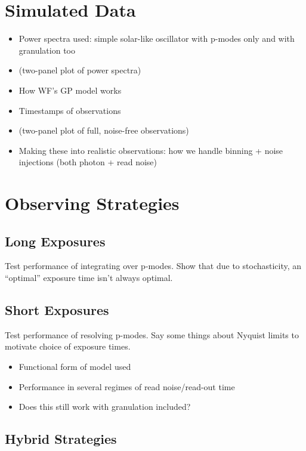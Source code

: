 \documentclass[modern]{aastex62}
\begin{document}
\section{Simulated Data}

\begin{itemize}
\item Power spectra used: simple solar-like oscillator with p-modes only and with granulation too
\item (two-panel plot of power spectra)
\item How WF's GP model works
\item Timestamps of observations
\item (two-panel plot of full, noise-free observations)
\item Making these into realistic observations: how we handle binning + noise injections (both photon + read noise)
\end{itemize}

\section{Observing Strategies}

\subsection{Long Exposures}

Test performance of integrating over p-modes. Show that due to stochasticity, an ``optimal'' exposure time isn't always optimal.

\subsection{Short Exposures}

Test performance of resolving p-modes. Say some things about Nyquist limits to motivate choice of exposure times.

\begin{itemize}
\item Functional form of model used
\item Performance in several regimes of read noise/read-out time
\item Does this still work with granulation included?
\end{itemize}

\subsection{Hybrid Strategies}
\end{document}
